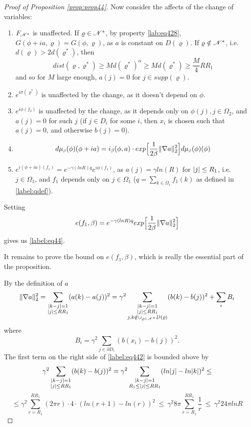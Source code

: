 \documentclass[11pt,reqno]{article}
\DeclarePairedDelimiter\abs{\lvert}{\rvert}%
\DeclarePairedDelimiter\norm{\lVert}{\rVert}%
\theoremstyle{definition}
\numberwithin{equation}{section}
\begin{document}
\begin{proof}[Proof of Proposition \eqref{prop:prop44}]
Now consider the affects of the change of variables:
\begin{enumerate}[label={\alph*)}]
\item $F_{\mathscr{N}^*}$ is unaffected. If $\varrho \in \mathscr{N}^*$, by property \eqref{lab:eq428}, $G(\phi+ia, \varrho) = G(\phi, \varrho)$, as $a$ is constant on $D(\varrho)$. If $\varrho \notin \mathscr{N}^*$, i.e. $d(\varrho) > 2d(\varrho^*)$, then
$$
dist(\varrho, \varrho^*) \geq Md(\varrho^*)^\alpha \geq Md(\varrho^*) \geq \frac{M}{4}RR_1
$$
and so for $M$ large enough, $a(j)=0$ for $j \in supp(\varrho)$.
\item $e^{i\sigma(\varrho^*)}$ is unaffected by the change, as it doesn't depend on $\phi$.
\item $ e^{i\phi(f_2)}$ is unaffected by the change, as it depends only on $\phi(j), j\in \Omega_2$, and $a(j)=0$ for such $j$ (if $j \in D_i$ for some $i$, then $x_i$ is chosen such that $a(j)=0$, and otherwise $b(j)=0$).
\item 
$$
\mida(\phi + ia) = i_\beta(\phi, a) \cdot exp\Big[\frac{1}{2\beta} \norm{\nabla a}_2^2 \Big]\mida(\phi)
$$
\item $e^{i(\phi + ia)(f_1)} = e^{-\gamma (lnR) q} e^{i\phi(f_1)}$, as $a(j)=\gamma ln(R)$ for $\abs{j} \leq R_1$, i.e. $j \in \Omega_1$, and $f_1$ depends only on $j \in \Omega_1$ ($q = \sum_{k \in \Omega_1}f_1(k)$ as defined in \eqref{label:qdef}).
\end{enumerate}
Setting 
$$
e(f_1, \beta) = e^{-\gamma (lnR) q} exp\Big[\frac{1}{2\beta} \norm{\nabla a}_2^2 \Big]
$$
gives us \eqref{label:eq44}.

It remains to prove the bound on $e(f_1, \beta)$, which is really the essential part of the proposition.

By the definition of $a$
\begin{equation} \label{label:eq442}
\norm{\nabla a}_2^2 = 
\sum_{\substack{\abs{k-j}=1 \\ \abs{j} \leq RR_1}}(a(k)-a(j))^2 =
\gamma^2 \sum_{\substack{\abs{k-j}=1 \\ \abs{j} \leq RR_1 \\ j,k \notin \cup_{\varrho \in \ens^*} D(\varrho)}}(b(k)-b(j))^2 + \sum_i B_i
\end{equation}
where
\begin{equation} \label{label:eq443}
B_i = \gamma^2 \sum_{j \in \partial D_i} (b(x_i) -b(j))^2.
\end{equation}
The first term on the right side of \eqref{label:eq442} is bounded above by
$$
\gamma^2 \sum_{\substack{\abs{k-j}=1 \\ \abs{j} \leq RR_1}} (b(k)-b(j))^2 =
\gamma^2 \sum_{\substack{\abs{k-j}=1 \\ R_1 \leq \abs{j} \leq RR_1}} (ln\abs{j} - ln\abs{k})^2 \leq
$$
\begin{equation} \label{label:eq444}
\leq \gamma^2 \sum_{r = R_1}^{RR_1} (2\pi r) \cdot 4 \cdot (ln(r+1)-ln(r))^2 \ \leq \ 
\gamma^2 8\pi \sum_{r = R_1}^{RR_1} \frac{1}{r} \ \leq \ \gamma^2 24\pi lnR
\end{equation}


\end{proof}
\end{document}
